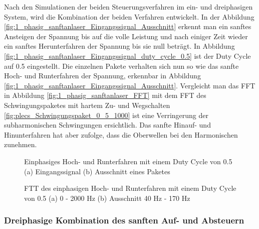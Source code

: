 Nach den Simulationen der beiden Steuerungsverfahren im ein- und dreiphasigen System, wird die Kombination der beiden Verfahren entwickelt. In der Abbildung \ref{fig:1_phasig_sanftanlaser_Eingangssignal_Ausschnitt} erkennt man ein sanftes Ansteigen der Spannung bis auf die volle Leistung und nach einiger Zeit wieder ein sanftes Herunterfahren der Spannung bis sie null beträgt. In Abbildung \ref{fig:1_phasig_sanftanlaser_Eingangssignal_duty_cycle_0.5} ist der Duty Cycle auf 0.5 eingestellt. Die einzelnen Pakete verhalten sich nun so wie das sanfte Hoch- und Runterfahren der Spannung, erkennbar in Abbildung \ref{fig:1_phasig_sanftanlaser_Eingangssignal_Ausschnitt}. Vergleicht man das FFT in Abbildung \ref{fig:1_phasig_sanftanlaser_FFT} mit dem FFT des Schwingungspaketes mit hartem Zu- und Wegschalten \ref{fig:plecs_Schwingungspaket_0_5_1000} ist eine Verringerung der subharmonischen Schwingungen ersichtlich. Das sanfte Hinauf- und Hinunterfahren hat aber zufolge, dass die Oberwellen bei den Harmonischen zunehmen. 

\begin{figure}[ht!]
	\centering
	\qquad
	\caption{Einphasiges Hoch- und Runterfahren mit einem Duty Cycle von 0.5 (a) Eingangssignal (b) Ausschnitt eines Paketes}
	\label{fig:einphasiges_Sanft_anlassen_Einganssignal}
\end{figure}

\begin{figure}[ht!]
	\centering
	\qquad
	\caption{FTT des einphasigen Hoch- und Runterfahren mit einem Duty Cycle von 0.5 (a) 0 - 2000 Hz (b) Ausschnitt 40 Hz - 170 Hz}
	\label{fig:einphasiges_Sanft_anlassen_FTT}
\end{figure}

\newpage
\subsubsection{Dreiphasige Kombination des sanften Auf- und Absteuern}

